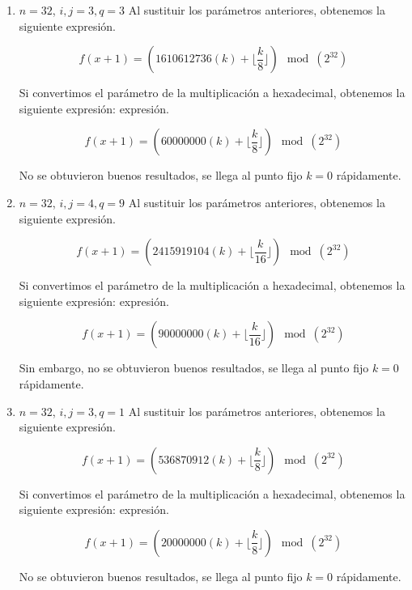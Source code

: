 \documentclass{llncs}
\begin{document}
\begin{enumerate}

\item $n= 32$, $i,j =3, q=3$ Al sustituir los parámetros anteriores, obtenemos la siguiente expresión.

\begin{equation}
f(x+1)=  \left( 1610612736(k) + \lfloor \frac{k}{8} \rfloor   \right) \mod(2^{32})
\end{equation}

Si convertimos el parámetro de la multiplicación a hexadecimal, obtenemos la siguiente expresión:
expresión.

\begin{equation}
f(x+1)=  \left(  60000000(k) + \lfloor \frac{k}{8} \rfloor   \right) \mod(2^{32})
\end{equation}

No se obtuvieron buenos resultados, se llega al punto fijo $k=0$ rápidamente.




\item $n= 32$, $i,j =4, q=9$ Al sustituir los parámetros anteriores, obtenemos la siguiente expresión.

\begin{equation}
f(x+1)=  \left(  2415919104(k) + \lfloor \frac{k}{16} \rfloor   \right) \mod(2^{32})
\end{equation}

Si convertimos el parámetro de la multiplicación a hexadecimal, obtenemos la siguiente expresión:
expresión.

\begin{equation}
f(x+1)=  \left(  90000000(k) + \lfloor \frac{k}{16} \rfloor   \right) \mod(2^{32})
\end{equation}

Sin embargo, no se obtuvieron buenos resultados, se llega al punto fijo $k=0$ rápidamente.




\item $n=32$, $i,j =3, q=1$ Al sustituir los parámetros anteriores, obtenemos la siguiente expresión.

\begin{equation}
f(x+1)=  \left( 536870912(k) + \lfloor \frac{k}{8} \rfloor   \right) \mod(2^{32})
\end{equation}

Si convertimos el parámetro de la multiplicación a hexadecimal, obtenemos la siguiente expresión:
expresión.

\begin{equation}
f(x+1)=  \left(  20000000(k) + \lfloor \frac{k}{8} \rfloor   \right) \mod(2^{32})
\end{equation}

No se obtuvieron buenos resultados, se llega al punto fijo $k=0$ rápidamente.
\end{enumerate}
\end{document}
